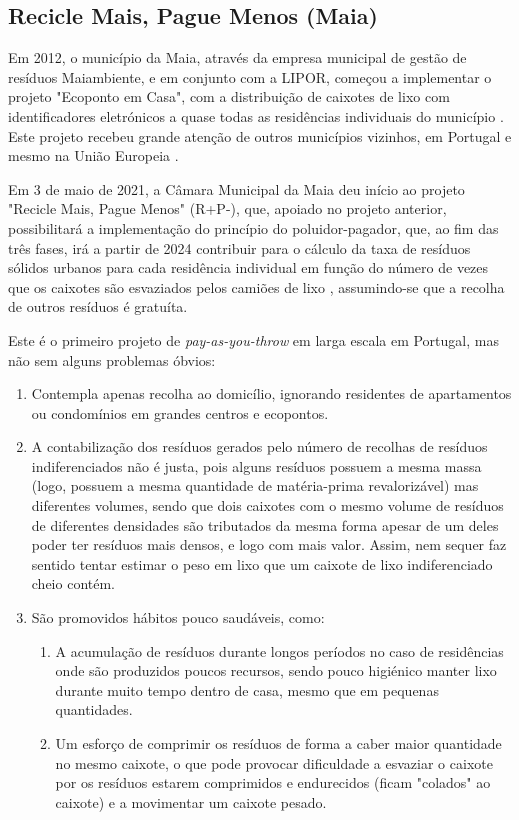 \documentclass[11pt, a4paper, oneside]{book}
\begin{document}
\subsection{Recicle Mais, Pague Menos (Maia)}

Em 2012, o município da Maia, através da empresa municipal de gestão de resíduos Maiambiente, e em conjunto com a LIPOR, começou a implementar o projeto "Ecoponto em Casa", com a distribuição de caixotes de lixo com identificadores eletrónicos a quase todas as residências individuais do município \cite{ecopontoemcasa-primeiramao, rmpm-noticiasmaia, rmpm-primeiramao}. Este projeto recebeu grande atenção de outros municípios vizinhos, em Portugal e mesmo na União Europeia \cite{rm-ue}.

Em 3 de maio de 2021, a Câmara Municipal da Maia deu início ao projeto "Recicle Mais, Pague Menos" (R+P-), que, apoiado no projeto anterior, possibilitará a implementação do princípio do poluidor-pagador, que, ao fim das três fases, irá a partir de 2024 contribuir para o cálculo da taxa de resíduos sólidos urbanos para cada residência individual em função do número de vezes que os caixotes são esvaziados pelos camiões de lixo \cite{rmpm-primeiramao}, assumindo-se que a recolha de outros resíduos é gratuíta.

Este é o primeiro projeto de \textit{pay-as-you-throw} em larga escala em Portugal, mas não sem alguns problemas óbvios:

\begin{enumerate}
    \item Contempla apenas recolha ao domicílio, ignorando residentes de apartamentos ou condomínios em grandes centros e ecopontos.

    \item A contabilização dos resíduos gerados pelo número de recolhas de resíduos indiferenciados não é justa, pois alguns resíduos possuem a mesma massa (logo, possuem a mesma quantidade de matéria-prima revalorizável) mas diferentes volumes, sendo que dois caixotes com o mesmo volume de resíduos de diferentes densidades são tributados da mesma forma apesar de um deles poder ter resíduos mais densos, e logo com mais valor. Assim, nem sequer faz sentido tentar estimar o peso em lixo que um caixote de lixo indiferenciado cheio contém.
    \item São promovidos hábitos pouco saudáveis, como:
    \begin{enumerate}
        \item A acumulação de resíduos durante longos períodos no caso de residências onde são produzidos poucos recursos, sendo pouco higiénico manter lixo durante muito tempo dentro de casa, mesmo que em pequenas quantidades.
        \item Um esforço de comprimir os resíduos de forma a caber maior quantidade no mesmo caixote, o que pode provocar dificuldade a esvaziar o caixote por os resíduos estarem comprimidos e endurecidos (ficam "colados" ao caixote) e a movimentar um caixote pesado.
    \end{enumerate}
\end{enumerate}
\end{document}

